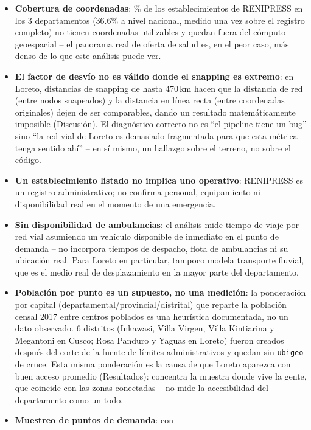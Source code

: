 \documentclass[11pt]{article}
\begin{document}
\begin{itemize}
  \item \textbf{Cobertura de coordenadas}: \statPctMissingCoords\% de los
  establecimientos de RENIPRESS en los 3 departamentos (36.6\% a nivel
  nacional, medido una vez sobre el registro completo) no tienen
  coordenadas utilizables y quedan fuera del cómputo geoespacial -- el
  panorama real de oferta de salud es, en el peor caso, más denso de lo
  que este análisis puede ver.
  \item \textbf{El factor de desvío no es válido donde el snapping es
  extremo}: en Loreto, distancias de snapping de hasta 470\,km hacen que
  la distancia de red (entre nodos snapeados) y la distancia en línea
  recta (entre coordenadas originales) dejen de ser comparables, dando un
  resultado matemáticamente imposible (Discusión). El diagnóstico correcto
  no es ``el pipeline tiene un bug'' sino ``la red vial de Loreto es
  demasiado fragmentada para que esta métrica tenga sentido ahí'' -- en sí
  mismo, un hallazgo sobre el terreno, no sobre el código.
  \item \textbf{Un establecimiento listado no implica uno operativo}:
  RENIPRESS es un registro administrativo; no confirma personal,
  equipamiento ni disponibilidad real en el momento de una emergencia.
  \item \textbf{Sin disponibilidad de ambulancias}: el análisis mide
  tiempo de viaje por red vial asumiendo un vehículo disponible de
  inmediato en el punto de demanda -- no incorpora tiempos de despacho,
  flota de ambulancias ni su ubicación real. Para Loreto en particular,
  tampoco modela transporte fluvial, que es el medio real de
  desplazamiento en la mayor parte del departamento.
  \item \textbf{Población por punto es un supuesto, no una medición}: la
  ponderación por capital (departamental/provincial/distrital) que reparte
  la población censal 2017 entre centros poblados es una heurística
  documentada, no un dato observado. 6 distritos (Inkawasi, Villa Virgen,
  Villa Kintiarina y Megantoni en Cusco; Rosa Panduro y Yaguas en Loreto)
  fueron creados después del corte de la fuente de límites administrativos
  y quedan sin \texttt{ubigeo} de cruce. Esta misma ponderación es la
  causa de que Loreto aparezca con buen acceso promedio (Resultados):
  concentra la muestra donde vive la gente, que coincide con las zonas
  conectadas -- no mide la accesibilidad del departamento como un todo.
  \item \textbf{Muestreo de puntos de demanda}: con \statNCentrosPoblados\

\end{itemize}
\end{document}
